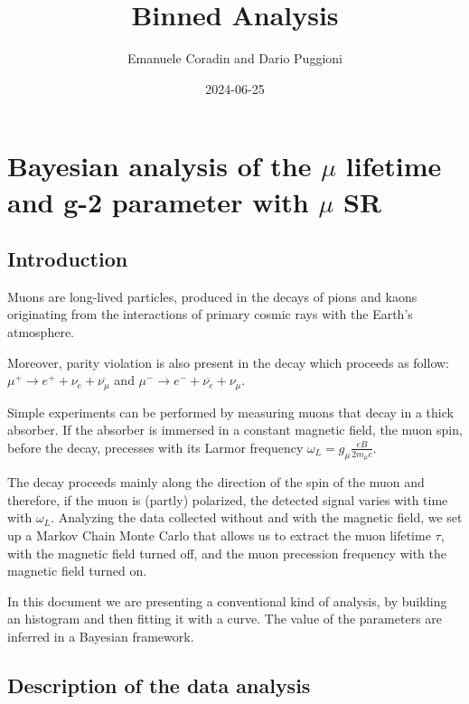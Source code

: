 \documentclass[
]{article}
\title{Binned Analysis}
\author{Emanuele Coradin and Dario Puggioni}
\date{2024-06-25}
\begin{document}
\maketitle

{
\setcounter{tocdepth}{2}
\tableofcontents
}
\section{\texorpdfstring{Bayesian analysis of the \(\mu\) lifetime and
g-2 parameter with \(\mu\)
SR}{Bayesian analysis of the \textbackslash mu lifetime and g-2 parameter with \textbackslash mu SR}}\label{bayesian-analysis-of-the-mu-lifetime-and-g-2-parameter-with-mu-sr}

\subsection{Introduction}\label{introduction}

Muons are long-lived particles, produced in the decays of pions and
kaons originating from the interactions of primary cosmic rays with the
Earth's atmosphere.

Moreover, parity violation is also present in the decay which proceeds
as follow: \(\mu^+ \rightarrow e^+ + \nu_e + \overline{\nu_\mu}\) and
\(\mu^- \rightarrow e^- + \overline{\nu_e} + \nu_\mu\).

Simple experiments can be performed by measuring muons that decay in a
thick absorber. If the absorber is immersed in a constant magnetic
field, the muon spin, before the decay, precesses with its Larmor
frequency \(\omega_L = g_{\mu} \frac{eB}{2 m_{\mu} c}\).

The decay proceeds mainly along the direction of the spin of the muon
and therefore, if the muon is (partly) polarized, the detected signal
varies with time with \(\omega_L\). Analyzing the data collected without
and with the magnetic field, we set up a Markov Chain Monte Carlo that
allows us to extract the muon lifetime \(\tau\), with the magnetic field
turned off, and the muon precession frequency with the magnetic field
turned on.

In this document we are presenting a conventional kind of analysis, by
building an histogram and then fitting it with a curve. The value of the
parameters are inferred in a Bayesian framework.

\subsection{Description of the data
analysis}\label{description-of-the-data-analysis}
\end{document}

